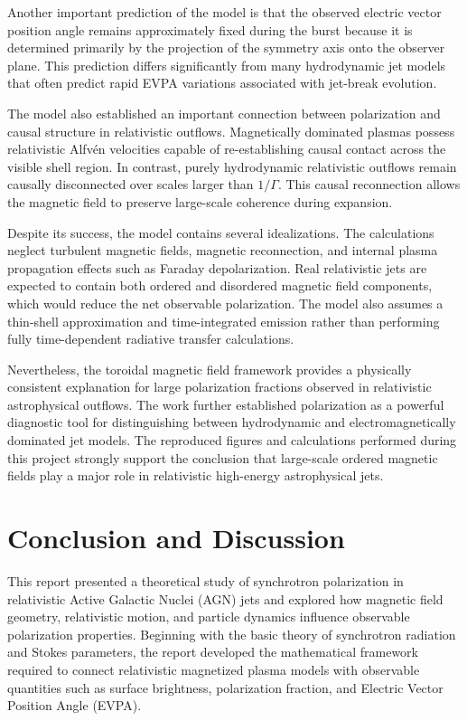 \documentclass{article}
\begin{document}
Another important prediction of the model is that the observed electric vector position angle remains approximately fixed during the burst because it is determined primarily by the projection of the symmetry axis onto the observer plane. This prediction differs significantly from many hydrodynamic jet models that often predict rapid EVPA variations associated with jet-break evolution.

The model also established an important connection between polarization and causal structure in relativistic outflows. Magnetically dominated plasmas possess relativistic Alfv\'en velocities capable of re-establishing causal contact across the visible shell region. In contrast, purely hydrodynamic relativistic outflows remain causally disconnected over scales larger than \(1/\Gamma\). This causal reconnection allows the magnetic field to preserve large-scale coherence during expansion.

Despite its success, the model contains several idealizations. The calculations neglect turbulent magnetic fields, magnetic reconnection, and internal plasma propagation effects such as Faraday depolarization. Real relativistic jets are expected to contain both ordered and disordered magnetic field components, which would reduce the net observable polarization. The model also assumes a thin-shell approximation and time-integrated emission rather than performing fully time-dependent radiative transfer calculations.

Nevertheless, the toroidal magnetic field framework provides a physically consistent explanation for large polarization fractions observed in relativistic astrophysical outflows. The work further established polarization as a powerful diagnostic tool for distinguishing between hydrodynamic and electromagnetically dominated jet models. The reproduced figures and calculations performed during this project strongly support the conclusion that large-scale ordered magnetic fields play a major role in relativistic high-energy astrophysical jets.

\section{Conclusion and Discussion}

This report presented a theoretical study of synchrotron polarization in relativistic Active Galactic Nuclei (AGN) jets and explored how magnetic field geometry, relativistic motion, and particle dynamics influence observable polarization properties. Beginning with the basic theory of synchrotron radiation and Stokes parameters, the report developed the mathematical framework required to connect relativistic magnetized plasma models with observable quantities such as surface brightness, polarization fraction, and Electric Vector Position Angle (EVPA).
\end{document}
